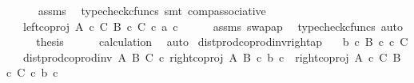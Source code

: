 \begin{isabellebody}
\ \ \ \ \isamarkupfalse%
\ assms\ \isamarkupfalse%
\ {\isacharparenleft}{\kern0pt}typecheck{\isacharunderscore}{\kern0pt}cfuncs{\isacharcomma}{\kern0pt}\ smt\ comp{\isacharunderscore}{\kern0pt}associative{}{\isacharparenright}{\kern0pt}\isanewline
\ \ \isamarkupfalse%
\ \isamarkupfalse%
\ {\isachardoublequoteopen}{\isachardot}{\kern0pt}{\isachardot}{\kern0pt}{\isachardot}{\kern0pt}\ {\isacharequal}{\kern0pt}\ left{\isacharunderscore}{\kern0pt}coproj\ {\isacharparenleft}{\kern0pt}A\ {\isasymtimes}\isactrlsub c\ C{\isacharparenright}{\kern0pt}\ {\isacharparenleft}{\kern0pt}B\ {\isasymtimes}\isactrlsub c\ C{\isacharparenright}{\kern0pt}\ {\isasymcirc}\isactrlsub c\ {\isasymlangle}a{\isacharcomma}{\kern0pt}\ c{\isasymrangle}{\isachardoublequoteclose}\isanewline
\ \ \ \ \isamarkupfalse%
\ assms\ swap{\isacharunderscore}{\kern0pt}ap\ \isamarkupfalse%
\ {\isacharparenleft}{\kern0pt}typecheck{\isacharunderscore}{\kern0pt}cfuncs{\isacharcomma}{\kern0pt}\ auto{\isacharparenright}{\kern0pt}\isanewline
\ \ \isamarkupfalse%
\ \isamarkupfalse%
\ {\isacharquery}{\kern0pt}thesis\isanewline
\ \ \ \ \isamarkupfalse%
\ calculation\ \isamarkupfalse%
\ auto\isanewline
{}\isamarkupfalse%
%
\endisatagproof
{\isafoldproof}%
%
\isadelimproof
\isanewline
%
\endisadelimproof
\isanewline
{}\isamarkupfalse%
\ dist{\isacharunderscore}{\kern0pt}prod{\isacharunderscore}{\kern0pt}coprod{\isacharunderscore}{\kern0pt}inv{}{\isacharunderscore}{\kern0pt}right{\isacharunderscore}{\kern0pt}ap{\isacharcolon}{\kern0pt}\isanewline
\ \ \ {\isachardoublequoteopen}b\ {\isasymin}\isactrlsub c\ B{\isachardoublequoteclose}\ {\isachardoublequoteopen}c\ {\isasymin}\isactrlsub c\ C{\isachardoublequoteclose}\isanewline
\ \ \ {\isachardoublequoteopen}dist{\isacharunderscore}{\kern0pt}prod{\isacharunderscore}{\kern0pt}coprod{\isacharunderscore}{\kern0pt}inv{}\ A\ B\ C\ {\isasymcirc}\isactrlsub c\ {\isasymlangle}right{\isacharunderscore}{\kern0pt}coproj\ A\ B\ {\isasymcirc}\isactrlsub c\ b{\isacharcomma}{\kern0pt}\ c{\isasymrangle}\ {\isacharequal}{\kern0pt}\ right{\isacharunderscore}{\kern0pt}coproj\ {\isacharparenleft}{\kern0pt}A\ {\isasymtimes}\isactrlsub c\ C{\isacharparenright}{\kern0pt}\ {\isacharparenleft}{\kern0pt}B\ {\isasymtimes}\isactrlsub c\ C{\isacharparenright}{\kern0pt}\ {\isasymcirc}\isactrlsub c\ {\isasymlangle}b{\isacharcomma}{\kern0pt}\ c{\isasymrangle}{\isachardoublequoteclose}\isanewline

\end{isabellebody}
